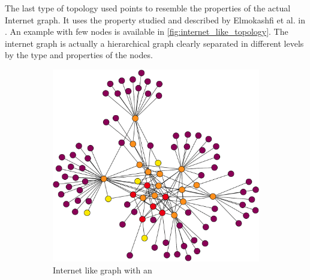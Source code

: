 The last type of topology used points to resemble the properties of the actual 
Internet graph.
It uses the property studied and described by Elmokashfi et al. in \cite{elmokashfi2010scalability}.
An example with few nodes is available in \cref{fig:internet_like_topology}.
The internet graph is actually a hierarchical graph clearly separated in different
levels by the type and properties of the nodes.

\begin{figure}[ht]
     \centering
     \begin{subfigure}[b]{0.4\textwidth}
         \centering
         \includegraphics[width=\textwidth]{images/internet_graph/graph-100-colored.pdf}
		 \caption{Internet like graph with an }
         \label{fig:internet_topology_explosive}
     \end{subfigure}
     \hfill
     \begin{subfigure}[b]{0.4\textwidth}
         \centering

\end{subfigure}
\end{figure}
